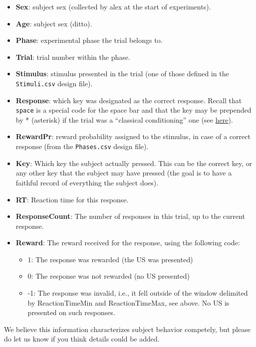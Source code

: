 \documentclass[11pt,]{article}
\begin{document}
\begin{itemize}
\item
  \textbf{Sex}: subject sex (collected by alex at the start of
  experiments).
\item
  \textbf{Age}: subject sex (ditto).
\item
  \textbf{Phase}: experimental phase the trial belongs to.
\item
  \textbf{Trial}: trial number within the phase.
\item
  \textbf{Stimulus}: stimulus presented in the trial (one of those
  defined in the \texttt{Stimuli.csv} design file).
\item
  \textbf{Response}: which key was designated as the correct response.
  Recall that \texttt{space} is a special code for the space bar and
  that the key may be prepended by * (asterisk) if the trial was a
  ``classical conditioning'' one (see \hyperref[responses]{here}).
\item
  \textbf{RewardPr}: reward probability assigned to the stimulus, in
  case of a correct response (from the \texttt{Phases.csv} design file).
\item
  \textbf{Key}: Which key the subject actually pressed. This can be the
  correct key, or any other key that the subject may have pressed (the
  goal is to have a faithful record of everything the subject does).
\item
  \textbf{RT}: Reaction time for this response.
\item
  \textbf{ResponseCount}: The number of responses in this trial, up to
  the current response.
\item
  \textbf{Reward}: The reward received for the response, using the
  following code:

  \begin{itemize}
  \item
    1: The response was rewarded (the US was presented)
  \item
    0: The response was not rewarded (no US presented)
  \item
    -1: The response was invalid, i.e., it fell outside of the window
    delimited by ReactionTimeMin and ReactionTimeMax, see above. No US
    is presented on such responses.
  \end{itemize}
\end{itemize}

We believe this information characterizes subject behavior competely,
but please do let us know if you think details could be added.
\end{document}
